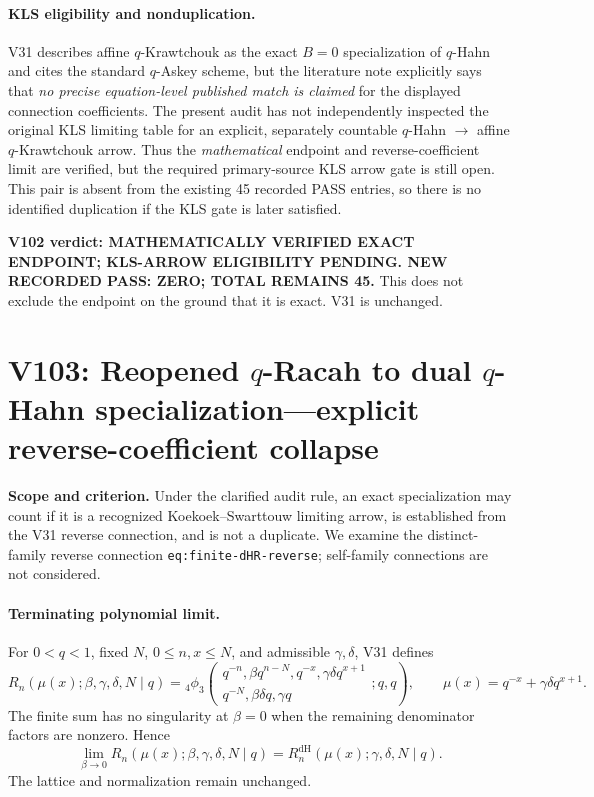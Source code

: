 \documentclass[11pt]{article}
\begin{document}
\paragraph{KLS eligibility and nonduplication.} V31 describes affine $q$-Krawtchouk as the exact $B=0$ specialization of $q$-Hahn and cites the standard $q$-Askey scheme, but the literature note explicitly says that \emph{no precise equation-level published match is claimed} for the displayed connection coefficients. The present audit has not independently inspected the original KLS limiting table for an explicit, separately countable $q$-Hahn $\to$ affine $q$-Krawtchouk arrow. Thus the \emph{mathematical} endpoint and reverse-coefficient limit are verified, but the required primary-source KLS arrow gate is still open. This pair is absent from the existing 45 recorded PASS entries, so there is no identified duplication if the KLS gate is later satisfied.

\noindent\textbf{V102 verdict: MATHEMATICALLY VERIFIED EXACT ENDPOINT; KLS-ARROW ELIGIBILITY PENDING. NEW RECORDED PASS: ZERO; TOTAL REMAINS 45.} This does not exclude the endpoint on the ground that it is exact. V31 is unchanged.


\clearpage
\section{V103: Reopened $q$-Racah to dual $q$-Hahn specialization---explicit reverse-coefficient collapse}
\noindent\textbf{Scope and criterion.} Under the clarified audit rule, an exact specialization may count if it is a recognized Koekoek--Swarttouw limiting arrow, is established from the V31 reverse connection, and is not a duplicate. We examine the distinct-family reverse connection \texttt{eq:finite-dHR-reverse}; self-family connections are not considered.

\paragraph{Terminating polynomial limit.} For $0<q<1$, fixed $N$, $0\le n,x\le N$, and admissible $\gamma,\delta$, V31 defines
\[
R_n(\mu(x);\beta,\gamma,\delta,N\mid q)
={}_4\phi_3\!\left(\begin{matrix}q^{-n},\beta q^{n-N},q^{-x},\gamma\delta q^{x+1}\\q^{-N},\beta\delta q,\gamma q\end{matrix};q,q\right),
\qquad \mu(x)=q^{-x}+\gamma\delta q^{x+1}.
\]
The finite sum has no singularity at $\beta=0$ when the remaining denominator factors are nonzero. Hence
\begin{equation}\label{eq:v103-r-dh}
\boxed{\lim_{\beta\to0}R_n(\mu(x);\beta,\gamma,\delta,N\mid q)
=R_n^{\mathrm{dH}}(\mu(x);\gamma,\delta,N\mid q).}
\end{equation}
The lattice and normalization remain unchanged.
\end{document}
